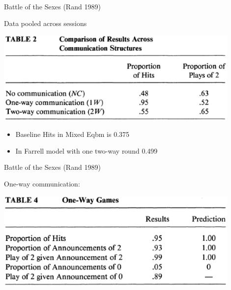 \documentclass{beamer}
\begin{document}
\begin{frame}{Battle of the Sexes (Rand 1989)}
	\begin{card}
		Data pooled across sessions
        
        	\begin{center}
        		\includegraphics[width=0.9\textwidth]{./i/cdfr1989Tbl2.eps}
        	\end{center}
        \end{card}
        \begin{card}
		\begin{itemize}
			\item Baseline Hits in Mixed Eqbm is 0.375
			\item In Farrell model with one two-way round 0.499
		\end{itemize}
		\end{card}
\end{frame}

\begin{frame}{Battle of the Sexes (Rand 1989)}
	\begin{card}
	One-way communication:
    
    	\begin{center}
    		\includegraphics[width=0.9\textwidth]{./i/cdfr1989Tbl4.eps}
    	\end{center}
	\end{card}
\end{frame}
\end{document}
